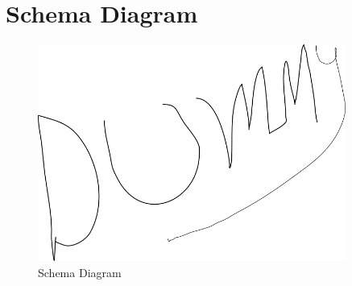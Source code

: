 \section{Schema Diagram}
\begin{figure}[h]
    \centering
    \includegraphics[width=0.9\textwidth]{images/dummy}
    \caption{Schema Diagram}
    \label{fig:Schema Diagram}
\end{figure}